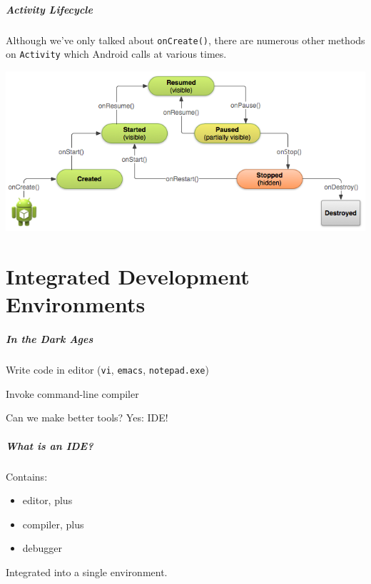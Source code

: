 \begin{frame}
\frametitle{Activity Lifecycle}
\begin{changemargin}{1cm}

Although we've only talked about {\tt onCreate()}, there are numerous
other methods on {\tt Activity} which Android calls at various times.

\begin{center}
\includegraphics[width=.9\textwidth]{images/basic-lifecycle}
\end{center}


\end{changemargin}
\end{frame}


\part{Integrated Development Environments}
\frame{\partpage}

\begin{frame}
\frametitle{In the Dark Ages}
\begin{changemargin}{1cm}

Write code in editor (\texttt{vi}, \texttt{emacs}, \texttt{notepad.exe})

Invoke command-line compiler

Can we make better tools? Yes: IDE! 

\end{changemargin}
\end{frame}


\begin{frame}
\frametitle{What is an IDE?}

\begin{changemargin}{1cm}
\Large
Contains:
\begin{itemize}
\item editor, plus
\item compiler, plus
\item debugger
\end{itemize}

Integrated into a single environment.

\end{changemargin}

\end{frame}

